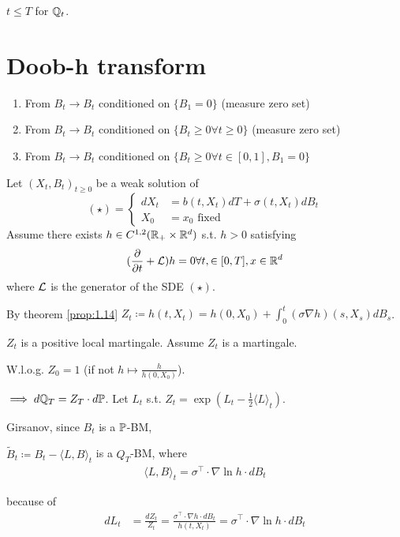 $t\leq T$ for $\mathbb{Q}_t$. 

\section{Doob-h transform}
\begin{enumerate}
    \item From $B_t\to B_t$ conditioned on $\{B_1=0\}$ (measure zero set)
    \item From $B_t\to B_t$ conditioned on $\{B_t\geq 0\forall t\geq 0\}$ (measure zero set)
    \item From $B_t\to B_t$ conditioned on $\{B_t\geq 0\forall t\in [0,1],B_1=0\}$
\end{enumerate}

Let $(X_t,B_t)_{t\geq 0}$ be a weak solution of 
\[(\star)=\begin{cases}
    dX_t &= b(t,X_t)dT+\sigma(t,X_t)dB_t\\
    X_0&=x_0\text{ fixed}
\end{cases}\]
Assume there exists $h\in C^{1,2}(\mathbb{R}_+\times\mathbb{R}^d)$ s.t. $h>0$ satisfying 
\begin{equation*}
    (\frac{\partial}{\partial t}+\mathcal{L})h=0\forall t,\in [0,T],x\in\mathbb{R}^d
\end{equation*}
where $\mathcal{L}$ is the generator of the SDE $(\star)$.

By theorem \ref{prop:1.14} $Z_t\coloneqq h(t,X_t)=h(0,X_0)+\int_0^t (\sigma \nabla h)(s,X_s)dB_s$.

$Z_t$ is a positive local martingale. Assume $Z_t$ is a martingale.

W.l.o.g. $Z_0=1$ (if not $h\mapsto \frac{h}{h(0,X_0)}$).

$\implies d\mathbb{Q}_T =Z_T\cdot d\mathbb{P}$. Let $L_t$ s.t. $Z_t=\exp(L_t-\frac{1}{2}\langle L\rangle_t)$.

Girsanov, since $B_t$ is a $\mathbb{P}$-BM, 

$\tilde{B}_t\coloneqq B_t-\langle L,B\rangle_t$ is a $Q_T$-BM, where 
\begin{align*}
    \langle L, B\rangle_t =\sigma^\intercal\cdot \nabla\ln h \cdot d B_t
\end{align*}

because of 
\begin{align*}
    dL_t&=\frac{dZ_t}{Z_t}=\frac{\sigma^\intercal\cdot  \nabla h \cdot d B_t}{h(t,X_t)}=\sigma^\intercal\cdot \nabla\ln h \cdot d B_t\\
\end{align*}

